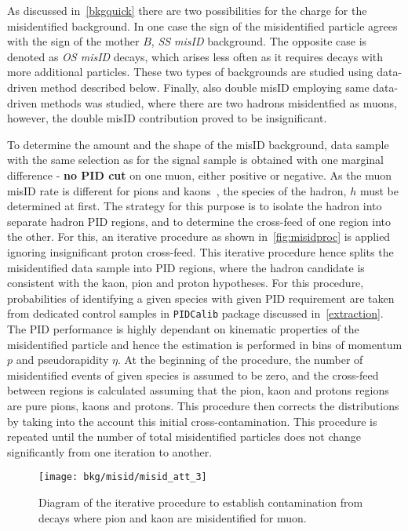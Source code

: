 As discussed in~\autoref{bkgquick} there are two possibilities for the charge for the misidentified background. In one case the sign of the misidentified particle agrees with the sign of the mother $B$, \textit{SS misID} background. The opposite case is denoted as \textit{OS misID} decays, which arises less often as it requires decays with more additional particles. These two types of backgrounds are studied using data-driven method described below. Finally, also double misID employing same data-driven methods was studied, where there are two hadrons misidentfied as muons, however, the double misID contribution proved to be insignificant.


To determine the amount and the shape of the misID background, data sample with the same selection as for the signal sample is obtained with one marginal difference - \textbf{no \gls{PID} cut} on one muon, either positive or negative. As the muon misID rate is different for pions and kaons~\cite{LHCb-DP-2013-001}, the species of the hadron, $h$ must be determined at first. The strategy for this purpose is to isolate the hadron into separate hadron \gls{PID} regions, and to determine the cross-feed of one region into the other. For this, an iterative procedure as shown in~\autoref{fig:misidproc} is applied ignoring insignificant proton cross-feed. This iterative procedure hence splits the misidentified data sample into \gls{PID} regions, where the hadron candidate is consistent with the kaon, pion and proton hypotheses. For this procedure, probabilities of identifying a given species with given \gls{PID} requirement are taken from dedicated control samples in \texttt{PIDCalib} package \cite{Anderlini:2202412} discussed in~\autoref{extraction}. The \gls{PID} performance is highly dependant on kinematic properties of the misidentified particle and hence the estimation is performed in bins of momentum $p$ and pseudorapidity $\eta$.
At the beginning of the procedure, the number of misidentified events of given species is assumed to be zero, and the
cross-feed between regions is calculated assuming that the pion, kaon and protons regions are pure pions, kaons and protons.
This procedure then corrects the distributions by taking into the account this initial cross-contamination.
This procedure is repeated until the number of total misidentified particles does not change significantly from one iteration to another.

\begin{figure}[h]
  \begin{center}
    \texttt{[image: bkg/misid/misid\_att\_3]}%
    \vspace*{-0.5cm}
  \end{center}
  \caption{
    Diagram of the iterative procedure to establish contamination from decays where pion and kaon are misidentified for muon.
    }
  \label{fig:misidproc}
\end{figure}



